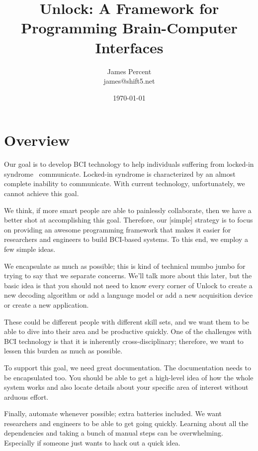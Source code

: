 \documentclass[11pt]{article}
\begin{document}
\title{\textbf{Unlock: A Framework for Programming Brain-Computer Interfaces}}
\author{James Percent \\
james@shift5.net}
\date{\today}
\parskip 11pt
\parindent 0pt
\maketitle
\tableofcontents
\section{Overview}\label{overviewsec}

Our goal is to develop BCI technology to help individuals suffering from locked-in syndrome~\cite{lis} communicate.  Locked-in syndrome is characterized by an almost complete inability to communicate.  With current technology, unfortunately, we cannot achieve this goal.

We think, if more smart people are able to painlessly collaborate, then we have a better shot at accomplishing this goal.  Therefore, our [simple] strategy is to focus on providing an awesome programming framework that makes it easier for researchers and engineers to build BCI-based systems.  To this end, we employ a few simple ideas.  

We encapsulate as much as possible; this is kind of technical mumbo jumbo for trying to say that we separate concerns.  We'll talk more about this later, but the basic idea is that you should not need to know every corner of Unlock to create a new decoding algorithm or add a language model or add a new acquisition device or create a new application.  

These could be different people with different skill sets, and we want them to be able to dive into their area and be productive quickly.  One of the challenges with BCI technology is that it is inherently cross-disciplinary; therefore, we want to lessen this burden as much as possible.

To support this goal, we need great documentation.  The documentation needs to be encapsulated too.  You should be able to get a high-level idea of how the whole system works and also locate details about your specific area of interest without arduous effort.  

Finally, automate whenever possible; extra batteries included.  We want researchers and engineers to be able to get going quickly.  Learning about all the dependencies and taking a bunch of manual steps can be overwhelming.  Especially if someone just wants to hack out a quick idea.  
\end{document}
